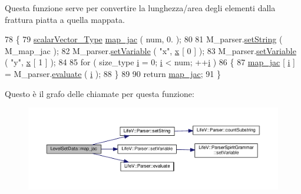 Questa funzione serve per convertire la lunghezza/area degli elementi dalla frattura piatta a quella mappata. 


\begin{DoxyCode}
78 \{
79     \hyperlink{Core_8h_a4e75b5863535ba1dd79942de2846eff0}{scalarVector\_Type} \hyperlink{classLevelSetData_a40fcfa36de7ac76613284d03690eb54b}{map\_jac} ( num, 0. );
80 
81     M\_parser.\hyperlink{classLifeV_1_1Parser_ac05769e836a0dc95d9c020df361a5194}{setString} ( M\_map\_jac );
82     M\_parser.\hyperlink{classLifeV_1_1Parser_aa2b362e12b8feb60231705d499c9fbae}{setVariable} ( \textcolor{stringliteral}{"x"}, \hyperlink{confronto_8m_ad2e52d4a42a755ccd73c8de47175afa3}{x} [ 0 ] );
83     M\_parser.\hyperlink{classLifeV_1_1Parser_aa2b362e12b8feb60231705d499c9fbae}{setVariable} ( \textcolor{stringliteral}{"y"}, \hyperlink{confronto_8m_ad2e52d4a42a755ccd73c8de47175afa3}{x} [ 1 ] );
84 
85     \textcolor{keywordflow}{for} ( size\_type \hyperlink{god__e_8m_a8604be5925f4266ab5ccc69675329c80}{i} = 0; \hyperlink{god__e_8m_a8604be5925f4266ab5ccc69675329c80}{i} < num; ++\hyperlink{god__e_8m_a8604be5925f4266ab5ccc69675329c80}{i} )
86     \{
87         \hyperlink{classLevelSetData_a40fcfa36de7ac76613284d03690eb54b}{map\_jac} [ \hyperlink{god__e_8m_a8604be5925f4266ab5ccc69675329c80}{i} ] = M\_parser.\hyperlink{classLifeV_1_1Parser_a51d84fd4ae6d420620e7beee58fad673}{evaluate} ( \hyperlink{god__e_8m_a8604be5925f4266ab5ccc69675329c80}{i} );
88     \}
89 
90     \textcolor{keywordflow}{return} \hyperlink{classLevelSetData_a40fcfa36de7ac76613284d03690eb54b}{map\_jac};
91 \}
\end{DoxyCode}


Questo è il grafo delle chiamate per questa funzione\-:
\nopagebreak
\begin{figure}[H]
\begin{center}
\leavevmode
\includegraphics[width=350pt]{classLevelSetData_a40fcfa36de7ac76613284d03690eb54b_cgraph}
\end{center}
\end{figure}


